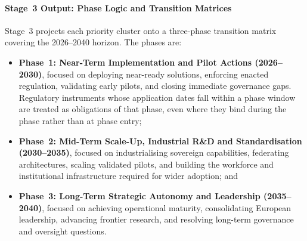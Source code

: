 \documentclass{ieeeaccess}
\begin{document}
\paragraph{Stage~3 Output: Phase Logic and Transition Matrices} Stage~3 projects each priority cluster onto a three-phase transition matrix covering the 2026--2040 horizon. The phases are:
\begin{itemize}
    \item \textbf{Phase~1: Near-Term Implementation and Pilot Actions (2026--2030)}, focused on deploying near-ready solutions, enforcing enacted regulation, validating early pilots, and closing immediate governance gaps. Regulatory instruments whose application dates fall within a phase window are treated as obligations of that phase, even where they bind during the phase rather than at phase entry;
    \item \textbf{Phase~2: Mid-Term Scale-Up, Industrial R\&D and Standardisation (2030--2035)}, focused on industrialising sovereign capabilities, federating architectures, scaling validated pilots, and building the workforce and institutional infrastructure required for wider adoption; and
    \item \textbf{Phase~3: Long-Term Strategic Autonomy and Leadership (2035--2040)}, focused on achieving operational maturity, consolidating European leadership, advancing frontier research, and resolving long-term governance and oversight questions.
\end{itemize}
\end{document}
